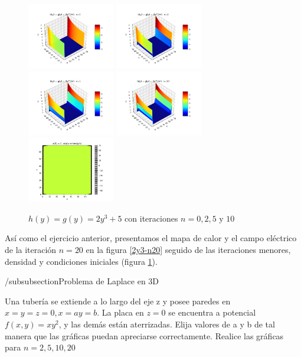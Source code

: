 \documentclass[10pt,journal,compsoc]{IEEEtran}
\begin{document}
\begin{figure}
  \centering
  \includegraphics[width=1.5in]{images/2y3-n0}
  \includegraphics[width=1.5in]{images/2y3-n2}
  \includegraphics[width=1.5in]{images/2y3-n5}
  \includegraphics[width=1.5in]{images/2y3-n10}
  \includegraphics[width=1.5in]{images/2y3-density}
  \caption{\(h(y) = g(y) = 2y^3+5\) con iteraciones \(n = 0, 2, 5 \text{ y } 10\)}
  \label{2y3-iterations}
\end{figure}

Así como el ejercicio anterior, presentamos el mapa de calor y el campo eléctrico de la iteración \(n=20\) en la figura \ref{2y3-n20} seguido de 
las iteraciones menores, densidad y condiciones iniciales (figura \ref{2y3-iterations}).


/subsubsection{Problema de Laplace en 3D}

Una tubería se extiende a lo largo del eje z
y posee paredes en \(x = y = z=0,x=a y=b\). La placa en \(z=0\) se encuentra a potencial
\(f(x,y) = xy^2\), y las demás están aterrizadas.
Elija valores de a y b de tal manera que las gráficas puedan apreciarse correctamente.
Realice las gráficas para \(n= 2, 5, 10, 20\)
\end{document}
